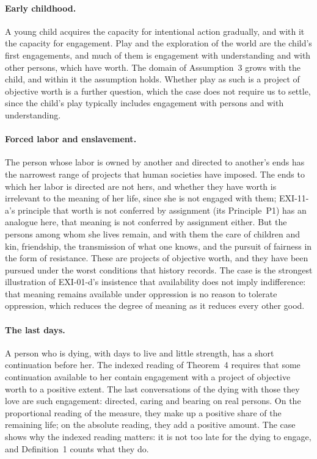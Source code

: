 \paragraph{Early childhood.} A young child acquires the capacity for intentional action gradually, and with it the capacity for engagement. Play and the exploration of the world are the child's first engagements, and much of them is engagement with understanding and with other persons, which have worth. The domain of Assumption~3 grows with the child, and within it the assumption holds. Whether play as such is a project of objective worth is a further question, which the case does not require us to settle, since the child's play typically includes engagement with persons and with understanding.

\paragraph{Forced labor and enslavement.} The person whose labor is owned by another and directed to another's ends has the narrowest range of projects that human societies have imposed. The ends to which her labor is directed are not hers, and whether they have worth is irrelevant to the meaning of her life, since she is not engaged with them; EXI-11-a's principle that worth is not conferred by assignment (its Principle~P1) has an analogue here, that meaning is not conferred by assignment either. But the persons among whom she lives remain, and with them the care of children and kin, friendship, the transmission of what one knows, and the pursuit of fairness in the form of resistance. These are projects of objective worth, and they have been pursued under the worst conditions that history records. The case is the strongest illustration of EXI-01-d's insistence that availability does not imply indifference: that meaning remains available under oppression is no reason to tolerate oppression, which reduces the degree of meaning as it reduces every other good.

\paragraph{The last days.} A person who is dying, with days to live and little strength, has a short continuation before her. The indexed reading of Theorem~4 requires that some continuation available to her contain engagement with a project of objective worth to a positive extent. The last conversations of the dying with those they love are such engagement: directed, caring and bearing on real persons. On the proportional reading of the measure, they make up a positive share of the remaining life; on the absolute reading, they add a positive amount. The case shows why the indexed reading matters: it is not too late for the dying to engage, and Definition~1 counts what they do.

